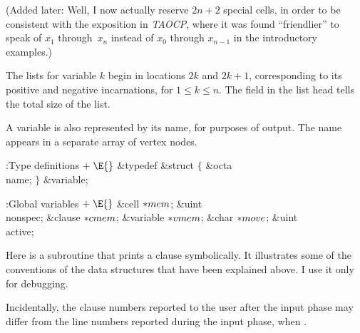 (Added later: Well, I now actually reserve $2n+2$ special cells, in order
to be consistent with the exposition in {\sl TAOCP}, where it was found
``friendlier'' to speak of $x_1$ through~$x_n$ instead of $x_0$ through
$x_{n-1}$ in the introductory examples.)

The lists for variable $k$ begin in locations $2k$ and $2k+1$, corresponding to
its positive and negative incarnations, for $1\le k\le n$. The 
field
in the list head tells the total size of the list.

A variable is also represented by its name, for purposes of output.
The name appears in a separate array  of vertex nodes.

\Y\B\4:Type definitions\X${}\mathrel+\E{}$\6
\&{typedef} \&{struct} ${}\{{}$\1\6
\&{octa} \\{name};\2\6
${}\}{}$ \&{variable};\par
\fi

\B{}:Global variables\X${}\mathrel+\E{}$\6
\&{cell} ${}{*}\\{mem}{}$;\6
\&{uint} \\{nonspec};\6
\&{clause} ${}{*}\\{cmem}{}$;\6
\&{variable} ${}{*}\\{vmem}{}$;\6
\&{char} ${}{*}\\{move}{}$;\6
\&{uint} \\{active};\par
\fi

Here is a subroutine that prints a clause symbolically. It
illustrates
some of the conventions of the data structures that have been explained above.
I use it only for debugging.

Incidentally, the clause numbers reported to the user after the input phase
may differ from the line numbers reported during the input phase,
when .

